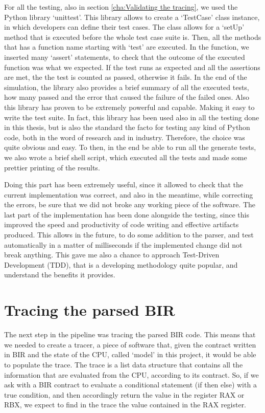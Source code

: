 For all the testing, also in section \ref{cha:Validating the tracing}, we used the
Python library `unittest'. This library allows to create a `TestCase' class
instance, in which developers can define their test cases. The class allows for
a `setUp' method that is executed before the whole test case suite is. Then, all
the methods that has a function name starting with `test' are executed. In the function,
we inserted many `assert' statements, to check that the outcome of the executed function
was what we expected. If the test runs as expected and all the assertions are
met, the the test is counted as passed, otherwise it fails. In the end of the simulation,
the library also provides a brief summary of all the executed tests, how many passed
and the error that caused the failure of the failed ones. Also this library has
proven to be extremely powerful and capable. Making it easy to write the test suite.
In fact, this library has been used also in all the testing done in this thesis,
but is also the standard the facto for testing any kind of Python code, both in the
word of research and in industry. Therefore, the choice was quite obvious and easy.
To then, in the end be able to run all the generate tests, we also wrote a brief
shell script, which executed all the tests and made some prettier printing of the
results.

Doing this part has been extremely useful, since it allowed to check that the
current implementation was correct, and also in the meantime, while correcting
the errors, be sure that we did not broke any working piece of the software. The
last part of the implementation has been done alongside the testing, since this improved
the speed and productivity of code writing and effective artifacts produced.
This allows in the future, to do some addition to the parser, and test
automatically in a matter of milliseconds if the implemented change did not
break anything. This gave me also a chance to approach Test-Driven Development (TDD),
that is a developing methodology quite popular, and understand the benefits it provides.

\section{Tracing the parsed BIR}
\label{cha:Tracing the parsed BIR} The next step in the pipeline was tracing the
parsed BIR code. This means that we needed to create a tracer, a piece of software
that, given the contract written in BIR and the state of the CPU, called `model'
in this project, it would be able to populate the trace. The trace is a list data
structure that contains all the information that are evaluated from the CPU,
according to its contract. So, if we ask with a BIR contract to evaluate a
conditional statement (if then else) with a true condition, and then accordingly
return the value in the register RAX or RBX, we expect to find in the trace the
value contained in the RAX register.

